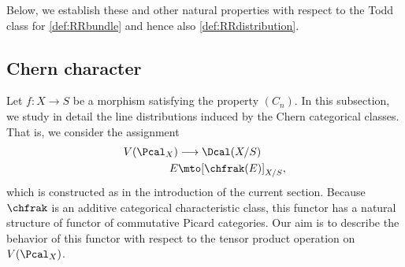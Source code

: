 Below, we establish these and other natural properties with respect to the Todd class for \eqref{def:RRbundle} and hence also \eqref{def:RRdistribution}.

\subsection{Chern character}
Let $f\colon X\to S$ be a morphism satisfying the property $(C_{n})$. In this subsection, we study in detail the line distributions induced by the Chern categorical classes. That is, we consider the assignment
\begin{displaymath}
\begin{split}
V(\Pcal_{X})&\longrightarrow \Dcal(X/S)\\
E&\mto [\chfrak(E)]_{X/S},
\end{split}
\end{displaymath}
which is constructed as in the introduction of the current section. Because $\chfrak$ is an additive categorical characteristic class, this functor has a natural structure of functor of commutative Picard categories. Our aim is to describe the behavior of this functor with respect to the tensor product operation on $V(\Pcal_{X})$.

